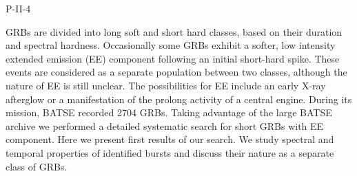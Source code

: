 P-II-4


\bigskip



\bigskip

\noindent GRBs are divided into long soft and short hard classes, based on their duration and spectral hardness. Occasionally some GRBs exhibit a softer, low intensity extended emission (EE) component following an initial short-hard spike. These events are considered as a separate population between two classes, although the nature of EE is still unclear. The possibilities for EE include an early X-ray afterglow or a manifestation of the prolong activity of a central engine. During its mission, BATSE recorded 2704 GRBs. Taking advantage of the large BATSE archive we performed a detailed systematic search for short GRBs with EE component. Here we present first results of our search. We study spectral and temporal properties of identified bursts and discuss their nature as a separate class of GRBs.
